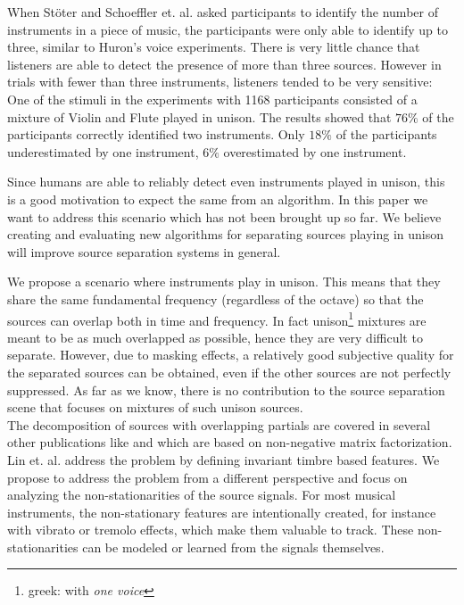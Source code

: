 When St\"oter and Schoeffler et. al. \cite{stoeter13, schoeffler13} asked participants to identify the number of instruments in a piece of music, the participants were only able to identify up to three, similar to Huron's voice experiments. There is very little chance that listeners are able to detect the presence of more than three sources. However in trials with fewer than three instruments, listeners tended to be very sensitive: One of the stimuli in the \cite{stoeter13, schoeffler13} experiments with 1168 participants consisted of a mixture of Violin and Flute played in unison. The results showed that $76\%$ of the participants correctly identified two instruments. Only $18\%$ of the participants underestimated by one instrument, $6\%$ overestimated by one instrument.

Since humans are able to reliably detect even instruments played in unison, this is a good motivation to expect the same from an algorithm. In this paper we want to address this scenario which has not been brought up so far. We believe creating and evaluating new algorithms for separating sources playing in unison will improve source separation systems in general.

We propose a scenario where instruments play in unison. This means that they share the same fundamental frequency (regardless of the octave) so that the sources can overlap both in time and frequency. In fact unison\footnote{greek: with \emph{one voice}} mixtures are meant to be as much overlapped as possible, hence they are very difficult to separate. However, due to masking effects, a relatively good subjective quality for the separated sources can be obtained, even if the other sources are not perfectly suppressed.
As far as we know, there is no contribution to the source separation scene that focuses on mixtures of such unison sources. \\

The decomposition of sources with overlapping partials are covered in several other publications like \cite{nakano10} and \cite{smaragdis08} which are based on non-negative matrix factorization. Lin et. al. \cite{lintimbre13} address the problem by defining invariant timbre based features. We propose to address the problem from a different perspective and focus on analyzing the non-stationarities of the source signals. For most musical instruments, the non-stationary features are intentionally created, for instance with vibrato or tremolo effects, which make them valuable to track. These non-stationarities can be modeled or learned from the signals themselves. \\

